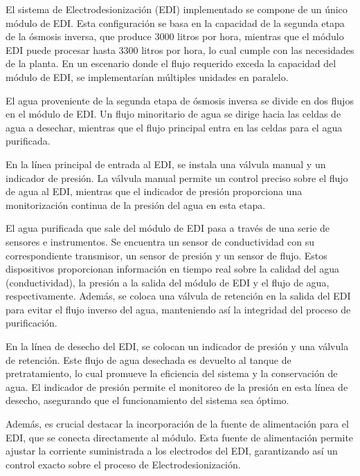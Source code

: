 El sistema de Electrodesionización (EDI) implementado se compone de un único módulo de EDI.
Esta configuración se basa en la capacidad de la segunda etapa de la ósmosis inversa, que
produce 3000 litros por hora, mientras que el módulo EDI puede procesar hasta 3300 litros por hora,
lo cual cumple con las necesidades de la planta. En un escenario donde el flujo requerido exceda la
capacidad del módulo de EDI, se implementarían múltiples unidades en paralelo.

El agua proveniente de la segunda etapa de ósmosis inversa se divide en dos flujos en el módulo de
EDI. Un flujo minoritario de agua se dirige hacia las celdas de agua a desechar, mientras que el flujo principal entra en las celdas para el agua purificada.


En la línea principal de entrada al EDI, se instala una válvula manual y un indicador de presión. La válvula manual permite un control preciso sobre el flujo de agua al EDI, mientras que el indicador de presión proporciona una monitorización continua de la presión del agua en esta etapa.

El agua purificada que sale del módulo de EDI pasa a través de una serie de sensores e instrumentos. Se encuentra un sensor de conductividad con su correspondiente transmisor, un sensor de presión y un sensor de flujo. Estos dispositivos proporcionan información en tiempo real sobre la calidad del agua (conductividad), la presión a la salida del módulo de EDI y el flujo de agua, respectivamente. Además, se coloca una válvula de retención en la salida del EDI para evitar el flujo inverso del agua, manteniendo así la integridad del proceso de purificación.

En la línea de desecho del EDI, se colocan un indicador de presión y una válvula de retención. Este flujo de agua desechada es devuelto al tanque de pretratamiento, lo cual promueve la eficiencia del sistema y la conservación de agua. El indicador de presión permite el monitoreo de la presión en esta línea de desecho, asegurando que el funcionamiento del sistema sea óptimo.

Además, es crucial destacar la incorporación de la fuente de alimentación para el EDI, que se conecta directamente al módulo. Esta fuente de alimentación permite ajustar la corriente suministrada a los electrodos del EDI, garantizando así un control exacto sobre el proceso de Electrodesionización.
